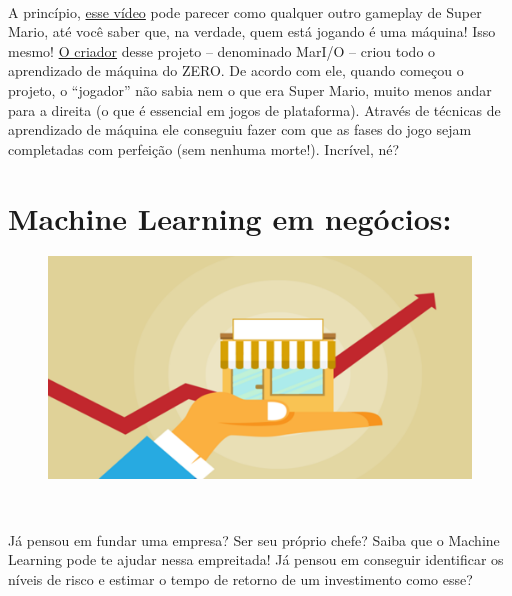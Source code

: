 \documentclass[12pt]{article}
\begin{document}
\


A princípio, \href{https://www.youtube.com/watch?v=qv6UVOQ0F44}{esse vídeo} pode parecer como qualquer outro gameplay de Super Mario, até você saber que, na verdade, quem está jogando é uma
máquina! Isso mesmo! \href{https://www.youtube.com/channel/UC8aG3LDTDwNR1UQhSn9uVrw}{O criador} desse projeto – denominado MarI/O –
criou todo o aprendizado de máquina do ZERO. De acordo com ele,
quando começou o projeto, o “jogador” não sabia nem o que era Super
Mario, muito menos andar para a direita (o que é essencial em jogos de
plataforma). Através de técnicas de aprendizado de máquina ele
conseguiu fazer com que as fases do jogo sejam completadas com
perfeição (sem nenhuma morte!). Incrível, né?
           
           \clearpage
           \section*{\centering Machine Learning em negócios:}\label{sec:ML_Negocios}
           \begin{figure}[ht]
           \centering
           \includegraphics[scale=0.4]{ldo-3.1.png}
           \end{figure}
   
  \
  
           Já pensou em fundar uma empresa? Ser seu próprio chefe? Saiba que
o Machine Learning pode te ajudar nessa empreitada! Já pensou em
conseguir identificar os níveis de risco e estimar o tempo de retorno de
um investimento como esse?
            
\end{document}
